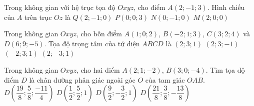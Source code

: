 \begin{ex}%
	Trong không gian với hệ trục tọa độ $Oxyz$, cho điểm $A(2;-1;3)$. Hình chiếu của $A$ trên trục $Oz$ là
	\choice
	{$Q(2;-1;0)$}
	{\True $P(0;0;3)$}
	{$N(0;-1;0)$}
	{$M(2;0;0)$}
\end{ex}
\begin{ex}%
	Trong không gian $Oxyz$, cho bốn điểm $A(1;0;2)$, $B(-2;1;3)$, $C(3;2;4)$ và $D(6;9;-5)$. Tọa độ trọng tâm của tứ diện $ABCD$ là
	\choice
	{\True $(2;3;1)$}
	{$(2;3;-1)$}
	{$(-2;3;1)$}
	{$(2;-3;1)$}
\end{ex}
\begin{ex}%
	Trong không gian $Oxyz$, cho hai điểm $A(2;1;-2)$, $B(3;0;-4)$. Tìm tọa độ điểm $D$ là chân đường phân giác ngoài góc $O$ của tam giác $OAB$.
	\choice
	{$D\left(\dfrac{19}{8};\dfrac{5}{8};\dfrac{-11}{4}\right)$}
	{\True $D\left(\dfrac{1}{2};\dfrac{5}{2};1\right)$}
	{$D\left(\dfrac{9}{2};-\dfrac{3}{2};1\right)$}
	{$D\left(\dfrac{21}{8};\dfrac{3}{8};-\dfrac{13}{8}\right)$}
\end{ex}

